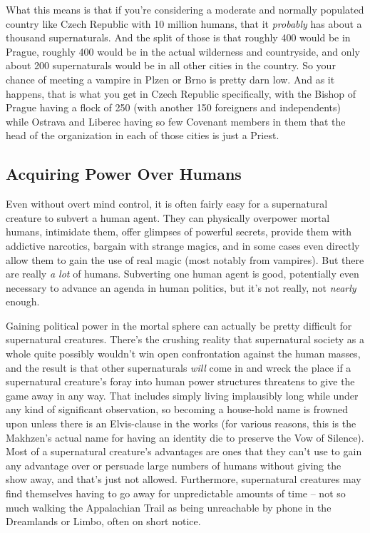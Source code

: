 What this means is that if you're considering a moderate and normally populated country like Czech Republic with 10 million humans, that it \textit{probably} has about a thousand supernaturals. And the split of those is that roughly 400 would be in Prague, roughly 400 would be in the actual wilderness and countryside, and only about 200 supernaturals would be in all other cities in the country. So your chance of meeting a vampire in Plzen or Brno is pretty darn low. And as it happens, that is what you get in Czech Republic specifically, with the Bishop of Prague having a flock of 250 (with another 150 foreigners and independents) while Ostrava and Liberec having so few Covenant members in them that the head of the organization in each of those cities is just a Priest.

\subsection{Acquiring Power Over Humans}

Even without overt mind control, it is often fairly easy for a supernatural creature to subvert a human agent. They can physically overpower mortal humans, intimidate them, offer glimpses of powerful secrets, provide them with addictive narcotics, bargain with strange magics, and in some cases even directly allow them to gain the use of real magic (most notably from vampires). But there are really \textit{ a lot} of humans. Subverting one human agent is good, potentially even necessary to advance an agenda in human politics, but it's not really, not \textit{nearly} enough.

Gaining political power in the mortal sphere can actually be pretty difficult for supernatural creatures. There's the crushing reality that supernatural society as a whole quite possibly wouldn't win open confrontation against the human masses, and the result is that other supernaturals \textit{will} come in and wreck the place if a supernatural creature's foray into human power structures threatens to give the game away in any way. That includes simply living implausibly long while under any kind of significant observation, so becoming a house-hold name is frowned upon unless there is an Elvis-clause in the works (for various reasons, this is the Makhzen's actual name for having an identity die to preserve the Vow of Silence). Most of a supernatural creature's advantages are ones that they can't use to gain any advantage over or persuade large numbers of humans without giving the show away, and that's just not allowed. Furthermore, supernatural creatures may find themselves having to go away for unpredictable amounts of time -- not so much walking the Appalachian Trail as being unreachable by phone in the Dreamlands or Limbo, often on short notice.

